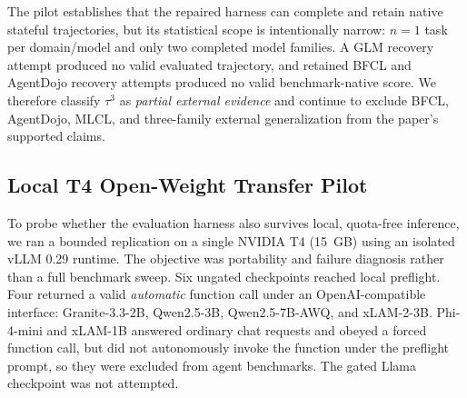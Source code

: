 The pilot establishes that the repaired harness can complete and retain native stateful trajectories, but its statistical scope is intentionally narrow: $n=1$ task per domain/model and only two completed model families. A GLM recovery attempt produced no valid evaluated trajectory, and retained BFCL and AgentDojo recovery attempts produced no valid benchmark-native score. We therefore classify $\tau^3$ as \emph{partial external evidence} and continue to exclude BFCL, AgentDojo, MLCL, and three-family external generalization from the paper's supported claims.

\subsection{Local T4 Open-Weight Transfer Pilot}
To probe whether the evaluation harness also survives local, quota-free inference, we ran a bounded replication on a single NVIDIA T4 (15~GB) using an isolated vLLM 0.29 runtime. The objective was portability and failure diagnosis rather than a full benchmark sweep. Six ungated checkpoints reached local preflight. Four returned a valid \emph{automatic} function call under an OpenAI-compatible interface: Granite-3.3-2B, Qwen2.5-3B, Qwen2.5-7B-AWQ, and xLAM-2-3B. Phi-4-mini and xLAM-1B answered ordinary chat requests and obeyed a forced function call, but did not autonomously invoke the function under the preflight prompt, so they were excluded from agent benchmarks. The gated Llama checkpoint was not attempted.

\begin{table}[t]
\centering
\caption{Bounded local-T4 transfer pilot. ``Auto tool'' is the preflight automatic function-call test. AgentDojo reports the two retained banking traces as attacked utility/security and no-injection utility/security. $\tau^3$ cells are native rewards; NE means not evaluable. BFCL produced no retained score before timeout for the four auto-tool-capable checkpoints.}
\label{tab:local-t4-pilot}
\small
{}
\end{table}

